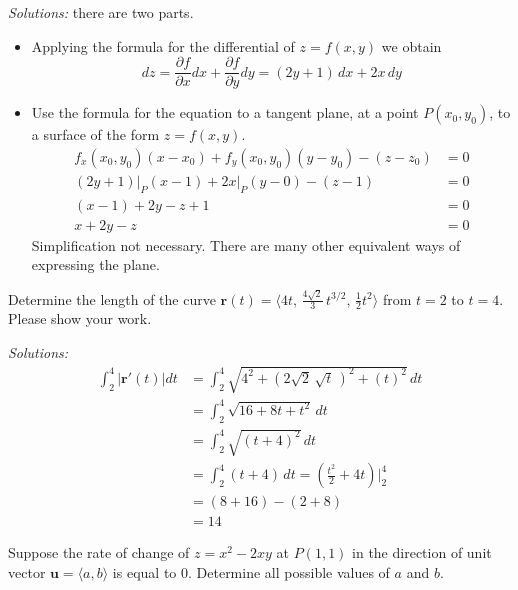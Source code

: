 \ifnum {} {\color{DarkBlue} \textit{Solutions:} there are two parts. \begin{itemize}
    \item Applying the formula for the differential of $z=f(x,y)$ we obtain $$dz = \frac{\partial f}{\partial x}dx + \frac{\partial f}{\partial y}dy =  (2y + 1) \, dx + 2x \, dy$$ 
    \item Use the formula for the equation to a tangent plane, at a point $P(x_0,y_0)$, to a surface of the form $z =f(x,y)$.
\begin{align*}
    f_x(x_0,y_0) (x-x_0) + f_y(x_0,y_0) (y-y_0) - (z-z_0) &= 0 \\ 
    (2y+1)\big|_P(x-1) + 2x\big|_P(y-0) - (z-1) &=0\\
    (x-1) + 2y - z+1&=0\\
    x+2y-z&=0
\end{align*}
Simplification not necessary. There are many other equivalent ways of expressing the plane. 
\end{itemize}
} 
\else
          \vspace{7cm}
\fi     
\fi



\ifnum {}
    \question[4] Determine the length of the curve $\mathbf r(t) = \langle 4t, \, \frac{4\sqrt2}{3} \, t^{3/2}, \, \frac12t^2\rangle$ from $t=2$ to $t=4$. Please show your work. 
    
    \ifnum {} {\color{DarkBlue} \textit{Solutions:} 
    \begin{align*}
        \int_2^4 | \mathbf r '(t) | dt 
        &= \int_2^4 \sqrt{4^2+(2\sqrt2 \, \sqrt t \,)^2 + (t)^2} \, dt  \\ 
        &= \int_2^4 \sqrt{16+8t+t^2} \, dt  \\
        &= \int_2^4 \sqrt{(t+4)^2} \, dt  \\
        &= \int_2^4 (t+4) \, dt = \left(\frac{t^2}{2} +4t \right)\bigg|_2^4 \\ 
        &= (8 + 16) - (2+8) \\
        &= 14 
    \end{align*}
    } 
    \else
        \vspace{9cm}
    \fi        
\fi  


\ifnum {}
\question[4] Suppose the rate of change of $z=x^2-2xy$ at $P(1,1)$ in the direction of unit vector $\mathbf u=\langle a,b \rangle$ is equal to $0$. Determine all possible values of $a$ and $b$.  

